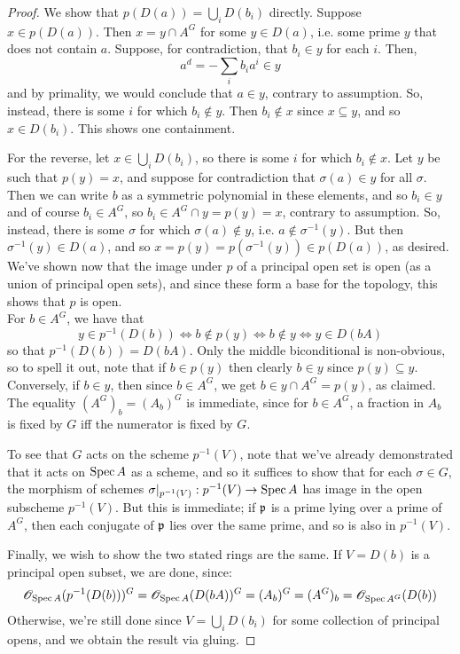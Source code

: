 \begin{proof}
	We show that $p(D(a)) = \bigcup_i D(b_i)$ directly. Suppose $x \in p(D(a))$. Then $x = y \cap A^G$ for some $y \in D(a)$, i.e. some prime $y$ that does not contain $a$. Suppose, for contradiction, that $b_i \in y$ for each $i$. Then,
	\[ a^d = -\sum_i b_ia^i \in y \]
	and by primality, we would conclude that $a \in y$, contrary to assumption. So, instead, there is some $i$ for which $b_i \notin y$. Then $b_i \notin x$ since $x \subseteq y$, and so $x \in D(b_i)$. This shows one containment.
	
	For the reverse, let $x \in \bigcup_i D(b_i)$, so there is some $i$ for which $b_i \notin x$. Let $y$ be such that $p(y) = x$, and suppose for contradiction that $\sigma(a) \in y$ for all $\sigma$. Then we can write $b$ as a symmetric polynomial in these elements, and so $b_i \in y$ and of course $b_i \in A^G$, so $b_i \in A^G \cap y = p(y) = x$, contrary to assumption. So, instead, there is some $\sigma$ for which $\sigma(a) \notin y$, i.e. $a \notin \sigma^{-1}(y)$. But then $\sigma^{-1}(y) \in D(a)$, and so $x = p(y) = p(\sigma^{-1}(y)) \in p(D(a))$, as desired. We've shown now that the image under $p$ of a principal open set is open (as a union of principal open sets), and since these form a base for the topology, this shows that $p$ is open. \\
	
	For $b \in A^G$, we have that
	\[ y \in p^{-1}(D(b)) \iff b \notin p(y) \iff b \notin y \iff y \in D(bA) \]
	so that $p^{-1}(D(b)) = D(bA)$. Only the middle biconditional is non-obvious, so to spell it out, note that if $b \in p(y)$ then clearly $b \in y$ since $p(y) \subseteq y$. Conversely, if $b \in y$, then since $b \in A^G$, we get $b \in y \cap A^G = p(y)$, as claimed. The equality $(A^G)_b = (A_b)^G$ is immediate, since for $b \in A^G$, a fraction in $A_b$ is fixed by $G$ iff the numerator is fixed by $G$. 
	
	To see that $G$ acts on the scheme $p^{-1}(V)$, note that we've already demonstrated that it acts on $\operatorname{Spec} A$ as a scheme, and so it suffices to show that for each $\sigma \in G$, the morphism of schemes $\sigma|_{p^{-1}(V)} : p^{-1}(V) \to \operatorname{Spec} A$ has image in the open subscheme $p^{-1}(V)$. But this is immediate; if $\mathfrak{p}$ is a prime lying over a prime of $A^G$, then each conjugate of $\mathfrak{p}$ lies over the same prime, and so is also in $p^{-1}(V)$.
	
	Finally, we wish to show the two stated rings are the same. If $V = D(b)$ is a principal open subset, we are done, since:
	\[ \mathscr{O}_{\operatorname{Spec} A}(p^{-1}(D(b)))^G = \mathscr{O}_{\operatorname{Spec} A}(D(bA))^G = (A_b)^G = (A^G)_b = \mathscr{O}_{\operatorname{Spec} A^G}(D(b)) \]
	Otherwise, we're still done since $V = \bigcup_i D(b_i)$ for some collection of principal opens, and we obtain the result via gluing.
\end{proof}
